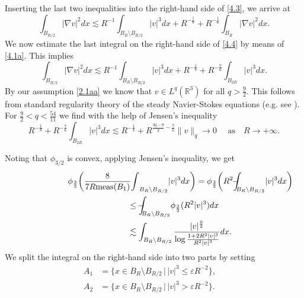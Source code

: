 \documentclass[12pt]{article}
\numberwithin{equation}{section}
\theoremstyle{definition}
\begin{document}
Inserting the last two  inequalities into the right-hand side of \eqref{4.3}, we arrive at
\begin{equation}
{\int\limits}_{B_{ R/2}} | \nabla {v} |^2 dx  \lesssim   R^{ -1}{\int\limits}_{B_R  \setminus B_{ R/2}} | {v} |^3dx  + R^{ -\frac18}
+  R^{ -\frac16} {\int\limits}_{B_R} | \nabla {v} |^2 dx. 
\label{4.4}
\end{equation}
We now estimate the last integral on the right-hand side of \eqref{4.4} by means of \eqref{4.1a}. This implies 
\begin{equation}
{\int\limits}_{B_{ R/2}} | \nabla {v} |^2  dx \lesssim   R^{ -1}{\int\limits}_{B_R  \setminus B_{ R/2}} | {v} |^3 dx + R^{ -\frac18}
+  R^{ -\frac76} {\int\limits}_{B_{ 2R}} | {v} |^3 dx. 
\label{4.5}
\end{equation}  
By our assumption \eqref{2.1aa} we know that $ {v} \in L^q({\mathbb{R}}^{3})$ for all $ q > \frac{9}{2}$. 
This follows from standard regularity theory of the steady Navier-Stokes equations (e.g. see \cite{ser2}). 
For $ \frac{9}{2} <q < \frac{54}{11}$ 
we find with  the help of Jensen's inequality  
\begin{equation}
R^{ -\frac18}+R^{ -\frac76} {\int\limits}_{B_{ 2R}} | {v} |^3 dx \lesssim R^{ -\frac18}+  R ^{ \frac{3q-9}{q}- \frac{7}{6}} \| {v} \|_{ q} \rightarrow 0\quad  
\text{ as}\quad  R \rightarrow +\infty. 
\label{4.9}
\end{equation}

Noting that $ \phi _{ 3/2}$ is convex, applying Jensen's inequality,  we get 
\begin{align*}
\lefteqn{\phi_{\frac32} \bigg(\frac{8}{7R{\operatorname{\rm meas}} ( B_1)} {\int\limits}_{B_{ R}  \setminus B_{ R/2}}  | {v} |^3 dx\bigg) =\phi_{\frac32} \bigg( R^2  {{\int\hspace{-830000sp}-\!\!}}_{B_{ R}  \setminus B_{ R/2}}   |v|^3 dx \bigg)}
\hspace{1.in}\\
&\leq
 {{\int\hspace{-830000sp}-\!\!}}_{B_{ R}  \setminus B_{ R/2}}  \phi _{ \frac32}(R^2| {v} |^3) dx
\\
 &\lesssim   \int_{B_{ R}  \setminus B_{ R/2}} \frac{| {v} |^{ \frac92}}{\log \frac{1+ 2R^2 | {v} |^3}{R^2 | {v} |^3}} dx.
 \end{align*}
We split the integral on the right-hand side into two parts by setting 
\begin{align*}
A_1 &= \{x\in B_{ R}  \setminus B_{ R/2} \,|\, | {v} |^3 \le {\varepsilon} R^{ -2}\},\quad  
\\
A_2 &= \{x\in B_{ R}  \setminus B_{ R/2} \,|\, | {v} |^3 >{\varepsilon} R^{ -2}\}.
\end{align*}
\end{document}
